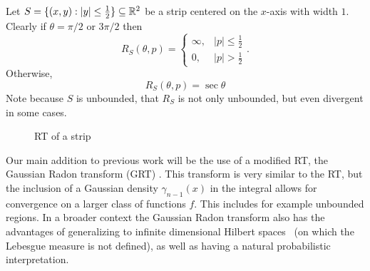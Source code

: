 \begin{myexample}
  \label{ex:RTStrip}
Let $S = \{(x,y) : |y| \leq \frac12\} \subseteq \mathbb{R}^2$ be a strip centered on the $x$-axis with width $1$. Clearly if $\theta = \pi/2$ or $3\pi/2$ then 
\[
  R_S(\theta, p) = 
  \begin{cases}
      \infty, & |p| \leq \frac12 \\
      0, & |p| > \frac12
  \end{cases}.
\]
Otherwise, 
\[
  R_S(\theta, p) = \sec \theta
\]
Note because $S$ is unbounded, that $R_S$ is not only unbounded, but even divergent in some cases.

\begin{figure}[h]
  \centering
  \caption{RT of a strip}\label{fig:strip}
\end{figure}
\end{myexample}

Our main addition to previous work will be the use of a modified RT, the Gaussian Radon transform (GRT) \cite{Miha04} \cite{Seng12} \cite{Seng14}. This transform is very similar to the RT, but the inclusion of a Gaussian density $\gamma_{n-1}(x)$ in the integral allows for convergence on a larger class of functions $f$. This includes for example unbounded regions. In a broader context the Gaussian Radon transform also has the advantages of generalizing to infinite dimensional Hilbert spaces~\cite{Seng14} (on which the Lebesgue measure is not defined), as well as having a natural probabilistic interpretation.


